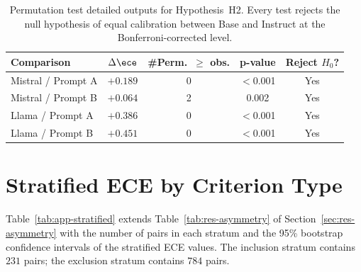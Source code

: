 \begin{table}[htbp]
    \centering
    \caption{Permutation test detailed outputs for Hypothesis~H2. 
        Every test rejects the null hypothesis of equal calibration 
        between Base and Instruct at the Bonferroni-corrected level.}
    \label{tab:app-h2-full}
    \small
    \begin{tabular}{@{}lcccc@{}}
        \toprule
        \textbf{Comparison} & 
        \boldmath$\Delta\ece$ & 
        \textbf{\#Perm.\ $\geq$ obs.} & 
        \textbf{p-value} & 
        \textbf{Reject $H_0$?} \\
        \midrule
        Mistral / Prompt A & $+0.189$ & 0    & $<$0.001 & Yes \\
        Mistral / Prompt B & $+0.064$ & 2    & 0.002    & Yes \\
        Llama / Prompt A   & $+0.386$ & 0    & $<$0.001 & Yes \\
        Llama / Prompt B   & $+0.451$ & 0    & $<$0.001 & Yes \\
        \bottomrule
    \end{tabular}
\end{table}

\section{Stratified ECE by Criterion Type}
\label{sec:app-stratified}

Table~\ref{tab:app-stratified} extends Table~\ref{tab:res-asymmetry} 
of Section~\ref{sec:res-asymmetry} with the number of pairs in each 
stratum and the 95\% bootstrap confidence intervals of the stratified 
ECE values. The inclusion stratum contains $231$ pairs; the exclusion 
stratum contains $784$ pairs.

